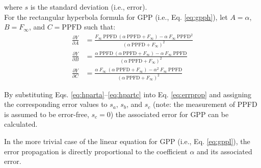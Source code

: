 \noindent where $s$ is the standard deviation (i.e., error).\\

For the rectangular hyperbola formula for GPP (i.e., Eq. \ref{eq:gpph}), let $A = \alpha$, $B = F_{\infty}$, and $C = \text{PPFD}$ such that:
\begin{subequations}
\label{eq:hpartial}
\begin{align}
    \frac{\partial Y}{\partial A}&= \frac{F_{\infty}\: \text{PPFD}\: 
                                    \left( \alpha\: \text{PPFD} + F_{\infty} 
                                    \right) - \alpha\: F_{\infty}\: 
                                    \text{PPFD}^{2}}{\left(\alpha\: 
                                    \text{PPFD} + F_{\infty} \right)^{2}} 
                                    \label{eq:hparta}\\
    \frac{\partial Y}{\partial B}&= \frac{\alpha\: \text{PPFD}\: 
                                    \left( \alpha\: \text{PPFD} + F_{\infty} 
                                    \right) - \alpha\: F_{\infty}\: 
                                    \text{PPFD}}{\left(\alpha\: 
                                    \text{PPFD} + F_{\infty} \right)^{2}} 
                                    \label{eq:hpartb}\\
    \frac{\partial Y}{\partial C}&= \frac{\alpha\: F_{\infty}\: 
                                    \left( \alpha\: \text{PPFD} + F_{\infty} 
                                    \right) - \alpha^{2}\: F_{\infty}\: 
                                    \text{PPFD}}{\left(\alpha\: 
                                    \text{PPFD} + F_{\infty} \right)^{2}}  
                                    \label{eq:hpartc}
\end{align}
\end{subequations}

By substituting Eqs. \ref{eq:hparta}--\ref{eq:hpartc} into Eq. \ref{eq:errprop} and assigning the corresponding error values to $s_{a}$, $s_{b}$, and $s_{c}$ (note: the measurement of PPFD is assumed to be error-free, $s_{c} = 0$) the associated error for GPP can be calculated. 

In the more trivial case of the linear equation for GPP (i.e., Eq. \ref{eq:gppl}), the error propagation is directly proportional to the coefficient $\alpha$ and its associated error.


